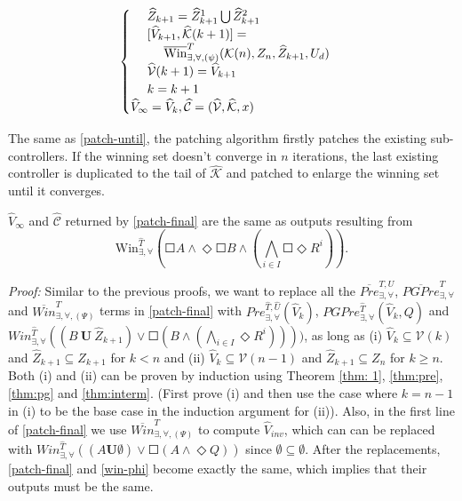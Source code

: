 {\begin{align}
\begin{cases}
\ \ \ \ \widehat{Z}_{k+1} = \widehat{Z}_{k+1}^1\bigcup\widehat{Z}_{k+1}^2  \\
\ \ \ \ [\widehat{V}_{k+1},\widehat{\mathcal{K}}(k+1)]=\\
\ \ \ \ \ \ \ \ \overline{\text{Win}}_{\exists,\forall,(\psi)}^{T}(\mathcal{K}(n),Z_{n},\widehat{Z}_{k+1},U_d)\\
\ \ \ \ \widehat{\mathcal{V}}(k+1)=\widehat{V}_{k+1}\\
\ \ \ \ {\color{black} k = k+1}\\
\widehat{V}_\infty = \widehat{V}_k, \widehat{\mathcal{C}} = (\widehat{\mathcal{V}},\widehat{\mathcal{K}},x) 
\end{cases}\label{patch-final}
\end{align}
}

The same as \eqref{patch-until}, the patching algorithm firstly patches the existing sub-controllers. If the winning set doesn't converge in $ n $ iterations, the last existing controller is duplicated to the tail of $ \widehat{\mathcal{K}} $ and patched to enlarge the winning set until it converges.

\begin{theorem}
	$ \widehat{V}_\infty $ and $ \widehat{\mathcal{C}} $ returned by \eqref{patch-final} are the same as outputs resulting from
\begin{displaymath}
	\text{Win}_{\exists, \forall}^{\widehat{T}}\left(\Square A \wedge \Diamond \Square B \wedge \left( \bigwedge_{i\in I} \Square \Diamond R^i\right)\right).
\end{displaymath} \label{thm:phi}
\end{theorem}
\emph{Proof:} Similar to the previous proofs, we want to replace all the $ \overline{Pre}^{T,U}_{\exists,\forall} $, $ \overline{PGPre}^{T}_{\exists,\forall} $ and $ \overline{Win}_{\exists,\forall, (\Psi)}^{T} $ terms in \eqref{patch-final} with $ Pre^{\widehat{T},\widehat{U}}_{\exists,\forall}(\widehat{V}_k) $, $PGPre^{\widehat{T}}_{\exists,\forall}(\widehat{V}_k, Q) $ and $ Win^{\widehat{T}}_{\exists,\forall}((B\ \mathbf{U}\ \widehat{Z}_{k+1})\vee\Square (B\wedge (\bigwedge_{i\in I}\Diamond R^i)))) $, as long as (i) $ \widehat{V}_{k} \subseteq \mathcal{V}(k) $ and $ \widehat{Z}_{k+1}\subseteq Z_{k+1} $ for $ k < n $ and (ii) $ \widehat{V}_k\subseteq \mathcal{V}(n-1) $ and $ \widehat{Z}_{k+1}\subseteq Z_n $ for $ k\geq n $. Both (i) and (ii) can be proven by induction using Theorem \ref{thm: 1}, \ref{thm:pre}, \ref{thm:pg} and \ref{thm:interm}. (First prove (i) and then use the case where $ k=n-1 $ in (i) to be the base case in the induction argument for (ii)). Also, in the first line of \eqref{patch-final} we use $ \overline{Win}_{\exists,\forall,(\Psi)}^{T} $ to compute $ \widehat{V}_{inv} $, which can can be replaced with $ Win_{\exists,\forall}^{\widehat{T}}((A\mathbf{U}\emptyset)\vee \Square(A\wedge \Diamond Q)) $ since $ \emptyset\subseteq \emptyset $. After the replacements, \eqref{patch-final} and \eqref{win-phi} become exactly the same, which implies that their outputs must be the same. \QEDB



